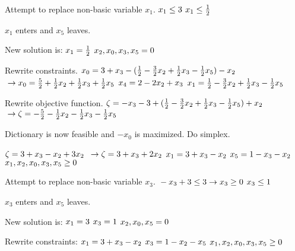 \documentclass[17pt]{extarticle}
\begin{document}
Attempt to replace non-basic variable $x_1$.
$\\ x_1 \leq 3$
$\\ x_1 \leq \frac{1}{2}$

$x_1$ enters and $x_5$ leaves.

New solution is:
$\\x_1 = \frac{1}{2}$
$\\x_2, x_0, x_3, x_5 = 0$

Rewrite constraints.
$\\ x_0 = 3 + x_3 - (\frac{1}{2} - \frac{3}{2}x_2 + \frac{1}{2}x_3 - \frac{1}{2}x_5) - x_2$
$\\\to x_0 = \frac{5}{2} + \frac{1}{2}x_2 + \frac{1}{2}x_3 + \frac{1}{2}x_5$
$\\ x_4 = 2 - 2x_2 + x_3$
$\\ x_1 = \frac{1}{2} - \frac{3}{2}x_2 + \frac{1}{2}x_3 - \frac{1}{2}x_5$

Rewrite objective function.
$\\\zeta = -x_3 - 3 + (\frac{1}{2} - \frac{3}{2}x_2 + \frac{1}{2}x_3 - \frac{1}{2}x_5) + x_2$
$\\\to \zeta = - \frac{5}{2} - \frac{1}{2}x_2 - \frac{1}{2}x_3 - \frac{1}{2}x_5$

Dictionary is now feasible and $-x_0$ is maximized. Do simplex.

$\\\zeta = 3 + x_3 - x_2 + 3x_2$
$\\\to \zeta = 3 + x_3 + 2x_2$
$\\ x_1 = 3 + x_3 - x_2$
$\\ x_5 = 1 - x_3 - x_2$
$\\ x_1, x_2, x_0, x_3, x_5 \geq 0$

Attempt to replace non-basic variable $x_3$.
$\\-x_3 + 3 \leq 3 \to x_3 \geq 0$
$\\x_3 \leq 1$

$x_3$ enters and $x_5$ leaves.

New solution is:
$\\x_1 = 3$
$\\x_3 = 1$
$\\x_2, x_0, x_5 = 0$

Rewrite constraints:
$\\ x_1 = 3 + x_3 - x_2$
$\\ x_3 = 1 - x_2 - x_5$
$\\ x_1, x_2, x_0, x_3, x_5 \geq 0$
\end{document}
